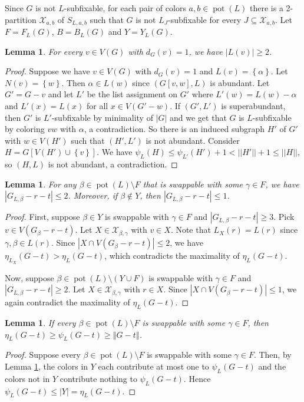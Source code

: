 \documentclass[12pt]{article}
\theoremstyle{plain}
\newtheorem{lem}[thm]{Lemma}
\theoremstyle{definition}
\theoremstyle{remark}
\newcommand{\fancy}[1]{\mathcal{#1}}
\newcommand{\set}[1]{\left\{ #1 \right\}}
\newcommand{\card}[1]{\left|#1\right|}
\newcommand{\size}[1]{\left\Vert#1\right\Vert}
\newcommand{\parens}[1]{\left( #1 \right)}
\newcommand{\pot}{\operatorname{pot}}
\def\X{\fancy{X}}
\begin{document}
	Since $G$ is not $L$-subfixable, for each pair of colors $a,b \in \pot(L)$ there is a 2-partition $\X_{a,b}$ of $S_{L,a,b}$ such that $G$ is not $L_J$-subfixable for every $J \subseteq \X_{a,b}$.  Let $F = F_L(G)$, $B = B_L(G)$ and $Y = Y_L(G)$.
	
	\begin{lem}
		For every $v \in V(G)$ with $d_G(v) = 1$, we have $|L(v)| \ge 2$.
	\end{lem}
	\begin{proof}
		Suppose we have $v \in V(G)$ with $d_G(v) = 1$ and $L(v) = \set{\alpha}$.  Let $N(v) = \set{w}$.  Then $\alpha \in L(w)$ since $(G[v,w], L)$ is abundant.  Let $G' = G-v$ and let $L'$ be the list assignment on $G'$ where $L'(w) = L(w) - \alpha$ and $L'(x) = L(x)$ for all $x \in V(G' - w)$.  If $(G', L')$ is superabundant, then $G'$ is $L'$-subfixable by minimality of $|G|$ and we get that $G$ is $L$-subfixable by coloring $vw$ with $\alpha$, a contradiction.  So there is an induced subgraph $H'$ of $G'$ with $w \in V(H')$ such that $(H', L')$ is not abundant.  Consider $H = G[V(H') \cup \set{v}]$.  We have $\psi_{L}(H) \le \psi_{L'}(H') + 1 < ||H'|| + 1 \le ||H||$, so $(H,L)$ is not abundant, a contradiction.
	\end{proof}

	\begin{lem}\label{SwappersAreSparse}
		For any $\beta \in \pot(L) \setminus F$ that is swappable with some $\gamma \in F$, we have $\card{G_{L,\beta} - r - t} \le 2$.  Moreover, if $\beta \not \in Y$, then $\card{G_{L,\beta} - r - t} \le 1$.
	\end{lem}
	\begin{proof}
		First, suppose $\beta \in Y$ is swappable with $\gamma \in F$ and $\card{G_{L,\beta} - r - t} \ge 3$.  Pick $v \in V(G_\beta - r - t)$.  Let $X \in \X_{\beta,\gamma}$ with $v \in X$.  Note that $L_X(r) = L(r)$ since $\gamma, \beta \in L(r)$.  Since $\card{X \cap V(G_\beta - r - t)} \le 2$,  we have $\eta_{L_X}(G - t) > \eta_L(G - t)$, which contradicts the maximality of $\eta_L(G - t)$.
		
		Now, suppose $\beta \in \pot(L) \setminus \parens{Y \cup F}$ is swappable with $\gamma \in F$ and $\card{G_{L,\beta} - r - t} \ge 2$.  Let $X \in \X_{\beta,\gamma}$ with $r \in X$.  Since $\card{X \cap V(G_\beta - r - t)} \le 1$, we again contradict the maximality of $\eta_L(G - t)$.
	\end{proof}
	
	\begin{lem}\label{AllSwappableLowPsi}
		If every $\beta \in \pot(L) \setminus F$ is swappable with some $\gamma \in F$, then $\eta_L(G-t) \ge \psi_L(G - t) \ge \size{G - t}$.
	\end{lem}
	\begin{proof}
		Suppose every $\beta \in \pot(L) \setminus F$ is swappable with some $\gamma \in F$.  Then, by Lemma \ref{SwappersAreSparse}, the colors in $Y$ each contribute at most one to $\psi_L(G - t)$ and the colors not in $Y$ contribute nothing to $\psi_L(G - t)$.  Hence $\psi_L(G - t) \le \card{Y} = \eta_L(G-t)$.
	\end{proof}
\end{document}
